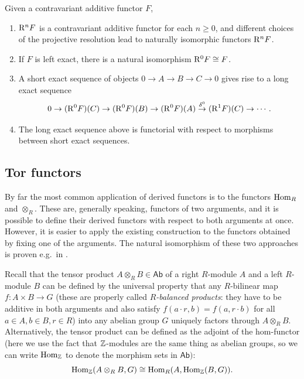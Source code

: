 \begin{thm}
    Given a contravariant additive functor $F$, 
    \begin{enumerate}
        \item $\mathrm{R}^nF$ is a contravariant additive functor for each $n\geq 0$, and different choices of the projective resolution lead to naturally isomorphic functors $\mathrm{R}^nF$.
        \item If $F$ is left exact, there is a natural isomorphism $\mathrm{R}^0F\cong F$.
        \item A short exact sequence of objects $0\to A\to B\to C\to 0$ gives rise to a long exact sequence
        \[0\to (\mathrm{R}^0F)(C)\to (\mathrm{R}^0F)(B)\to (\mathrm{R}^0F)(A)\overset{\delta^0}{\to} (\mathrm{R}^1F)(C)\to \cdots.\]
        \item The long exact sequence above is functorial with respect to morphisms between short exact sequences.
    \end{enumerate}
\end{thm}




\subsection{Tor functors}

By far the most common application of derived functors is to the functors $\operatorname{Hom}_R$ and $\otimes_R$. These are, generally speaking, functors of two arguments, and it is possible to define their derived functors with respect to both arguments at once. However, it is easier to apply the existing construction to the functors obtained by fixing one of the arguments. The natural isomorphism of these two approaches is proven e.g.~in \cite{Rotman}.

Recall that the tensor product $A\otimes_R B \in \mathsf{Ab}$ of a right $R$-module $A$ and a left $R$-module $B$ can be defined by the universal property that any $R$-bilinear map $f:A\times B\to G$ (these are properly called \emph{$R$-balanced products}: they have to be additive in both arguments and also satisfy $f(a\cdot r,b)=f(a,r\cdot b)$ for all $a\in A,b\in B,r\in R$) into any abelian group $G$ uniquely factors through $A\otimes_R B$. Alternatively, the tensor product can be defined as the adjoint of the hom-functor (here we use the fact that $\mathbb{Z}$-modules are the same thing as abelian groups, so we can write $\operatorname{Hom}_{\mathbb{Z}}$ to denote the morphism sets in $\mathsf{Ab})$:
\[\operatorname{Hom}_{\mathbb{Z}}(A\otimes_R B,G)\cong \operatorname{Hom}_R(A,\operatorname{Hom}_{\mathbb{Z}}(B,G)).\]

